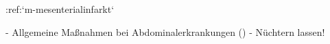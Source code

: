 %
:ref:`m-mesenterialinfarkt`\begin{itemize}
  -   Allgemeine Maßnahmen bei Abdominalerkrankungen
  ()
  -   Nüchtern lassen!
\end{itemize}